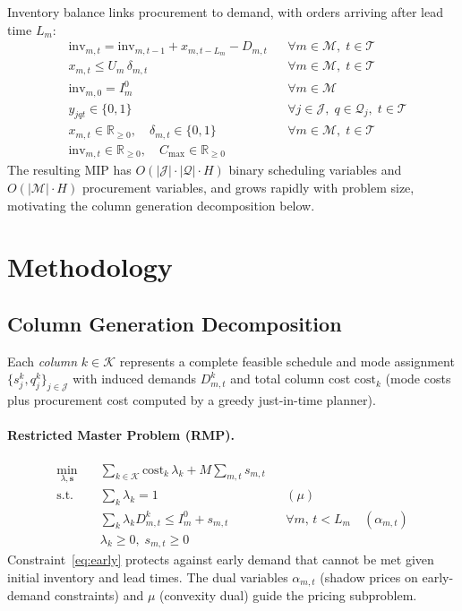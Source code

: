\documentclass[11pt]{article}
\newcommand{\R}{\mathbb{R}}
\newcommand{\calK}{\mathcal{K}}
\newcommand{\calJ}{\mathcal{J}}
\newcommand{\calM}{\mathcal{M}}
\newcommand{\calQ}{\mathcal{Q}}
\newcommand{\calT}{\mathcal{T}}
\begin{document}
Inventory balance links procurement to demand, with orders arriving after lead time $L_m$:
\begin{align}
    & \mathrm{inv}_{m,t} = \mathrm{inv}_{m,t-1} + x_{m, t - L_m} - D_{m,t} && \forall m \in \calM, \; t \in \calT \label{eq:inv}\\
    & x_{m,t} \leq U_m \, \delta_{m,t} && \forall m \in \calM, \; t \in \calT \label{eq:setup}\\
    & \mathrm{inv}_{m,0} = I_m^0 && \forall m \in \calM \label{eq:init}\\
    & y_{jqt} \in \{0,1\} && \forall j \in \calJ, \; q \in \calQ_j, \; t \in \calT \label{eq:ybin}\\
    & x_{m,t} \in \R_{\geq 0}, \quad \delta_{m,t} \in \{0,1\} && \forall m \in \calM, \; t \in \calT \label{eq:xdbin}\\
    & \mathrm{inv}_{m,t} \in \R_{\geq 0}, \quad C_{\max} \in \R_{\geq 0} && \label{eq:nonneg}
\end{align}
The resulting MIP has $O(|\calJ| \cdot |\calQ| \cdot H)$ binary scheduling variables and $O(|\calM| \cdot H)$ procurement variables, and grows rapidly with problem size, motivating the column generation decomposition below.


\section{Methodology}\label{sec:method}

\subsection{Column Generation Decomposition}

Each \emph{column} $k \in \calK$ represents a complete feasible schedule and mode assignment $\{s_j^k, q_j^k\}_{j \in \calJ}$ with induced demands $D^k_{m,t}$ and total column cost $\mathrm{cost}_k$ (mode costs plus procurement cost computed by a greedy just-in-time planner).


\paragraph{Restricted Master Problem (RMP).}
\begin{align}
    \min_{\lambda, \bm{s}} \quad & \sum_{k \in \calK} \mathrm{cost}_k \, \lambda_k + M \sum_{m,t} s_{m,t} \label{eq:rmp-obj}\\
    \text{s.t.} \quad
    & \sum_{k} \lambda_k = 1 && (\mu) \label{eq:conv}\\
    & \sum_{k} \lambda_k D^k_{m,t} \leq I_m^0 + s_{m,t} && \forall m, \, t < L_m \quad (\alpha_{m,t}) \label{eq:early}\\
    & \lambda_k \geq 0, \; s_{m,t} \geq 0
\end{align}
Constraint~\eqref{eq:early} protects against early demand that cannot be met given initial inventory and lead times.
The dual variables $\alpha_{m,t}$ (shadow prices on early-demand constraints) and $\mu$ (convexity dual) guide the pricing subproblem.
\end{document}
